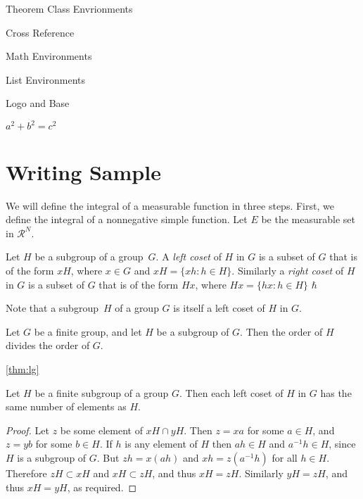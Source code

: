 \documentclass[11pt,fancy,twocol]{elegantbook}
\begin{document}
\begin{introduction}
\item Theorem Class Envrionments
\item Cross Reference
\item Math Environments
\item List Environments
\item Logo and Base 
\item $a^2+b^2=c^2$
\end{introduction}


\lipsum[1]

\section{Writing Sample}

We will define the integral of a measurable function in three steps. First, we define the integral of a nonnegative simple function. Let $E$ be the measurable set in $\mathcal{R}^N$.

\begin{definition}
Let $H$ be a subgroup of a group~$G$.  A \emph{left coset} of $H$ in $G$ is a subset of $G$ that is of the form $xH$, where $x \in G$ and $xH = \{ xh : h \in H \}$. Similarly a \emph{right coset} of $H$ in $G$ is a subset of $G$ that is of the form $Hx$, where $Hx = \{ hx : h \in H \}$ $\hbar$
\end{definition}

\begin{note}
Note that a subgroup~$H$ of a group $G$ is itself a left coset of $H$ in $G$.
\end{note}

\lipsum[2]

\begin{theorem} \label{thm:lg}
Let $G$ be a finite group, and let $H$ be a subgroup of $G$.  Then the order of $H$ divides the order of $G$.
\end{theorem}

\ref{thm:lg}
\lipsum[3]

   
\begin{proposition}
Let $H$ be a finite subgroup of a group $G$.  Then each left coset of $H$ in $G$ has the same number of elements as $H$.
\end{proposition}

\begin{proof}
Let $z$ be some element of $xH \cap yH$.  Then $z = xa$ for some $a \in H$, and $z = yb$ for some $b \in H$. If $h$ is any element of $H$ then $ah \in H$ and $a^{-1}h \in H$, since $H$ is a subgroup of $G$. But $zh = x(ah)$ and $xh = z(a^{-1}h)$ for all $h \in H$. Therefore $zH \subset xH$ and $xH \subset zH$, and thus $xH = zH$.  Similarly $yH = zH$, and thus $xH = yH$, as required. 
\end{proof}
\end{document}
